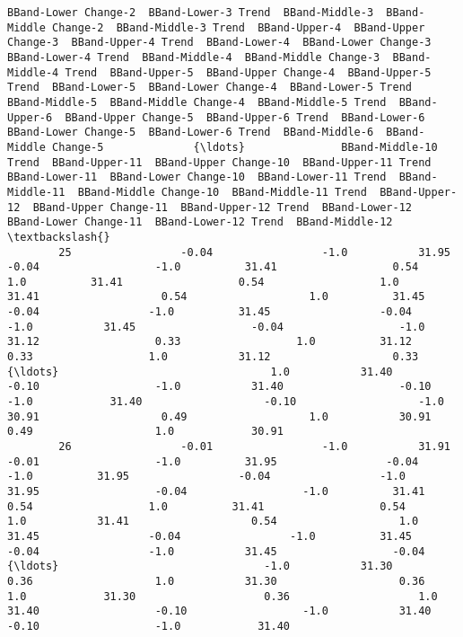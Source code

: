 \documentclass[11pt]{article}
\begin{document}
\begin{Verbatim}[commandchars=\\\{\}]
            BBand-Lower Change-2  BBand-Lower-3 Trend  BBand-Middle-3  BBand-Middle Change-2  BBand-Middle-3 Trend  BBand-Upper-4  BBand-Upper Change-3  BBand-Upper-4 Trend  BBand-Lower-4  BBand-Lower Change-3  BBand-Lower-4 Trend  BBand-Middle-4  BBand-Middle Change-3  BBand-Middle-4 Trend  BBand-Upper-5  BBand-Upper Change-4  BBand-Upper-5 Trend  BBand-Lower-5  BBand-Lower Change-4  BBand-Lower-5 Trend  BBand-Middle-5  BBand-Middle Change-4  BBand-Middle-5 Trend  BBand-Upper-6  BBand-Upper Change-5  BBand-Upper-6 Trend  BBand-Lower-6  BBand-Lower Change-5  BBand-Lower-6 Trend  BBand-Middle-6  BBand-Middle Change-5              {\ldots}               BBand-Middle-10 Trend  BBand-Upper-11  BBand-Upper Change-10  BBand-Upper-11 Trend  BBand-Lower-11  BBand-Lower Change-10  BBand-Lower-11 Trend  BBand-Middle-11  BBand-Middle Change-10  BBand-Middle-11 Trend  BBand-Upper-12  BBand-Upper Change-11  BBand-Upper-12 Trend  BBand-Lower-12  BBand-Lower Change-11  BBand-Lower-12 Trend  BBand-Middle-12  \textbackslash{}
        25                 -0.04                 -1.0           31.95                  -0.04                  -1.0          31.41                  0.54                  1.0          31.41                  0.54                  1.0           31.41                   0.54                   1.0          31.45                 -0.04                 -1.0          31.45                 -0.04                 -1.0           31.45                  -0.04                  -1.0          31.12                  0.33                  1.0          31.12                  0.33                  1.0           31.12                   0.33              {\ldots}                                 1.0           31.40                  -0.10                  -1.0           31.40                  -0.10                  -1.0            31.40                   -0.10                   -1.0           30.91                   0.49                   1.0           30.91                   0.49                   1.0            30.91   
        26                 -0.01                 -1.0           31.91                  -0.01                  -1.0          31.95                 -0.04                 -1.0          31.95                 -0.04                 -1.0           31.95                  -0.04                  -1.0          31.41                  0.54                  1.0          31.41                  0.54                  1.0           31.41                   0.54                   1.0          31.45                 -0.04                 -1.0          31.45                 -0.04                 -1.0           31.45                  -0.04              {\ldots}                                -1.0           31.30                   0.36                   1.0           31.30                   0.36                   1.0            31.30                    0.36                    1.0           31.40                  -0.10                  -1.0           31.40                  -0.10                  -1.0            31.40   

\end{Verbatim}
\end{document}
